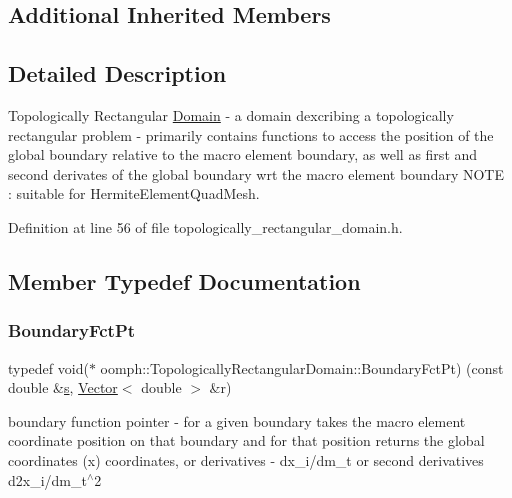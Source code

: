 \subsection*{Additional Inherited Members}


\subsection{Detailed Description}
Topologically Rectangular \hyperlink{classoomph_1_1Domain}{Domain} -\/ a domain dexcribing a topologically rectangular problem -\/ primarily contains functions to access the position of the global boundary relative to the macro element boundary, as well as first and second derivates of the global boundary wrt the macro element boundary N\+O\+TE \+: suitable for Hermite\+Element\+Quad\+Mesh. 

Definition at line 56 of file topologically\+\_\+rectangular\+\_\+domain.\+h.



\subsection{Member Typedef Documentation}
\mbox{\label{classoomph_1_1TopologicallyRectangularDomain_a8b2e24f5500d86c93aef509c5410e7cc}} 
\subsubsection{\texorpdfstring{Boundary\+Fct\+Pt}{BoundaryFctPt}}
{\footnotesize\ttfamily typedef void($\ast$ oomph\+::\+Topologically\+Rectangular\+Domain\+::\+Boundary\+Fct\+Pt) (const double \&\hyperlink{cfortran_8h_ab7123126e4885ef647dd9c6e3807a21c}{s}, \hyperlink{classoomph_1_1Vector}{Vector}$<$ double $>$ \&r)}



boundary function pointer -\/ for a given boundary takes the macro element coordinate position on that boundary and for that position returns the global coordinates (x) coordinates, or derivatives -\/ dx\+\_\+i/dm\+\_\+t or second derivatives d2x\+\_\+i/dm\+\_\+t$^\wedge$2 



